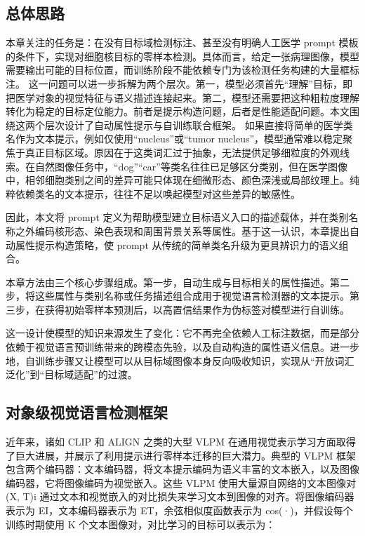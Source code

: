 \subsection{总体思路}
本章关注的任务是：在没有目标域检测标注、甚至没有明确人工医学 prompt 模板的条件下，实现对细胞核目标的零样本检测。具体而言，给定一张病理图像，模型需要输出可能的目标位置，而训练阶段不能依赖专门为该检测任务构建的大量框标注。
这一问题可以进一步拆解为两个层次。第一，模型必须首先“理解”目标，即把医学对象的视觉特征与语义描述连接起来。第二，模型还需要把这种粗粒度理解转化为稳定的目标定位能力。前者是提示构造问题，后者是性能适配问题。本文围绕这两个层次设计了自动属性提示与自训练联合框架。
如果直接将简单的医学类名作为文本提示，例如仅使用“nucleus”或“tumor nucleus”，模型通常难以稳定聚焦于真正目标区域。原因在于这类词汇过于抽象，无法提供足够细粒度的外观线索。在自然图像任务中，“dog”“car”等类名往往已足够区分类别，但在医学图像中，相邻细胞类别之间的差异可能只体现在细微形态、颜色深浅或局部纹理上。纯粹依赖类名的文本提示，往往不足以唤起模型对这些差异的敏感性。

因此，本文将 prompt 定义为帮助模型建立目标语义入口的描述载体，并在类别名称之外编码核形态、染色表现和周围背景关系等属性。基于这一认识，本章提出自动属性提示构造策略，使 prompt 从传统的简单类名升级为更具辨识力的语义组合。

本章方法由三个核心步骤组成。第一步，自动生成与目标相关的属性描述。第二步，将这些属性与类别名称或任务描述组合成用于视觉语言检测器的文本提示。第三步，在获得初始零样本预测后，以高置信结果作为伪标签对模型进行自训练。

这一设计使模型的知识来源发生了变化：它不再完全依赖人工标注数据，而是部分依赖于视觉语言预训练带来的跨模态先验，以及自动构造的属性语义信息。进一步地，自训练步骤又让模型可以从目标域图像本身反向吸收知识，实现从“开放词汇泛化”到“目标域适配”的过渡。

\subsection{对象级视觉语言检测框架}
近年来，诸如 CLIP \cite{radford2021learning} 和 ALIGN \cite{jia2021scaling} 之类的大型 VLPM 在通用视觉表示学习方面取得了巨大进展，并展示了利用提示进行零样本迁移的巨大潜力。典型的 VLPM 框架包含两个编码器：文本编码器，将文本提示编码为语义丰富的文本嵌入，以及图像编码器，它将图像编码为视觉嵌入。这些 VLPM 使用大量源自网络的文本图像对 {(X, T)}i 通过文本和视觉嵌入的对比损失来学习文本到图像的对齐。将图像编码器表示为 EI，文本编码器表示为 ET，余弦相似度函数表示为 cos(·)，并假设每个训练时期使用 K 个文本图像对，对比学习的目标可以表示为：

